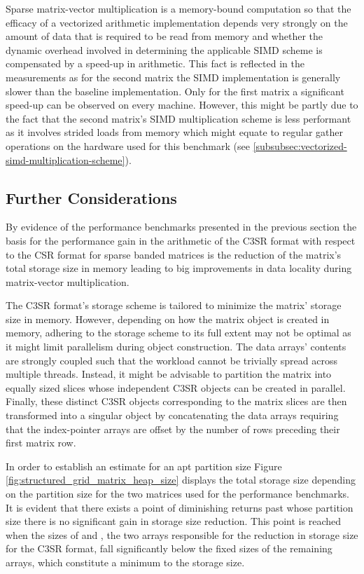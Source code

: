 \documentclass{article}
\begin{document}
    Sparse matrix-vector multiplication is a memory-bound computation so that the efficacy of a vectorized arithmetic implementation depends very strongly on the amount of data that is required to be read from memory and whether the dynamic overhead involved in determining the applicable SIMD scheme is compensated by a speed-up in arithmetic. This fact is reflected in the measurements as for the second matrix the SIMD implementation is generally slower than the baseline implementation. Only for the first matrix a significant speed-up can be observed on every machine. However, this might be partly due to the fact that the second matrix's SIMD multiplication scheme is less performant as it involves strided loads from memory which might equate to regular gather operations on the hardware used for this benchmark (see \ref{subsubsec:vectorized-simd-multiplication-scheme}).

  \subsection{Further Considerations}

    By evidence of the performance benchmarks presented in the previous section the basis for the performance gain in the arithmetic of the C3SR format with respect to the CSR format for sparse banded matrices is the reduction of the matrix's total storage size in memory leading to big improvements in data locality during matrix-vector multiplication.

    The C3SR format's storage scheme is tailored to minimize the matrix' storage size in memory. However, depending on how the matrix object is created in memory, adhering to the storage scheme to its full extent may not be optimal as it might limit parallelism during object construction. The data arrays' contents are strongly coupled such that the workload cannot be trivially spread across multiple threads. Instead, it might be advisable to partition the matrix into equally sized slices whose independent C3SR objects can be created in parallel. Finally, these distinct C3SR objects corresponding to the matrix slices are then transformed into a singular object by concatenating the data arrays requiring that the index-pointer arrays are offset by the number of rows preceding their first matrix row.

    In order to establish an estimate for an apt partition size Figure \ref{fig:structured_grid_matrix_heap_size} displays the total storage size depending on the partition size for the two matrices used for the performance benchmarks. It is evident that there exists a point of diminishing returns past whose partition size there is no significant gain in storage size reduction. This point is reached when the sizes of \V and \J, the two arrays responsible for the reduction in storage size for the C3SR format, fall significantly below the fixed sizes of the remaining arrays, which constitute a minimum to the storage size.
\end{document}
